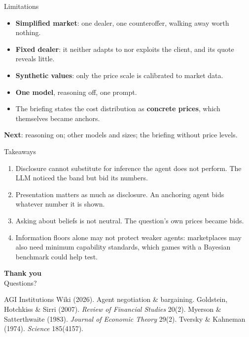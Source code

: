 \documentclass[aspectratio=169,11pt]{beamer}
\begin{document}
\begin{frame}{Limitations}
  \begin{itemize}
    \item \textbf{Simplified market}: one dealer, one counteroffer, walking away worth nothing.
    \item \textbf{Fixed dealer}: it neither adapts to nor exploits the client, and its quote reveals little.
    \item \textbf{Synthetic values}: only the price scale is calibrated to market data.
    \item \textbf{One model}, reasoning off, one prompt.
    \item The briefing states the cost distribution as \textbf{concrete prices}, which themselves became anchors.
  \end{itemize}
  \vspace{0.5em}
  \textbf{Next}: reasoning on; other models and sizes; the briefing without price levels.
\end{frame}

\begin{frame}{Takeaways}
  \begin{enumerate}
    \item \alert{Disclosure cannot substitute for inference the agent does not perform.} The LLM noticed the band but bid its numbers.
    \item \alert{Presentation matters as much as disclosure.} An anchoring agent bids whatever number it is shown.
    \item \alert{Asking about beliefs is not neutral.} The question's own prices became bids.
    \item Information floors alone may not protect weaker agents: marketplaces may also need \alert{minimum capability standards}, which games with a Bayesian benchmark could help test.
  \end{enumerate}
\end{frame}

\begin{frame}[plain]
  \centering\vfill
  {\Large\textcolor{accent}{\textbf{Thank you}}}\\[1em]
  Questions?
  \vfill
  \raggedright\scriptsize\textcolor{muted}{
  AGI Institutions Wiki (2026). Agent negotiation \& bargaining. \quad
  Goldstein, Hotchkiss \& Sirri (2007). \textit{Review of Financial Studies} 20(2). \quad
  Myerson \& Satterthwaite (1983). \textit{Journal of Economic Theory} 29(2). \quad
  Tversky \& Kahneman (1974). \textit{Science} 185(4157).}
\end{frame}
\end{document}
